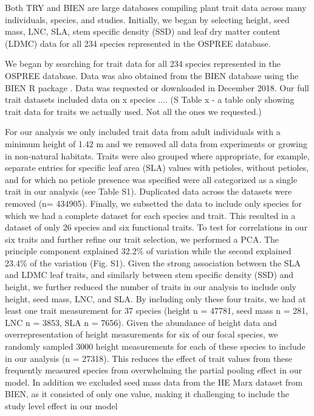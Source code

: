 \documentclass{article}\usepackage[]{graphicx}\usepackage[]{color}
\begin{document}
Both TRY and BIEN are large databases compiling plant trait data across many individuals, species, and studies. Initially, we began by selecting height, seed mass, LNC, SLA, stem specific density (SSD) and leaf dry matter content (LDMC) data for all 234 species represented in the OSPREE database.  


We began by searching for trait data for all 234 species represented in the OSPREE database. Data was also obtained from the BIEN database using the BIEN R package \citep{Maitner2017}. Data was requested or downloaded in December 2018. Our full trait datasets included data on x species .... (S Table x - a table only showing trait data for traits we actually used. Not all the ones we requested.) 

For our analysis we only included trait data from adult individuals with a minimum height of 1.42 m and we removed all data from experiments or growing in non-natural habitats. Traits were also grouped where appropriate, for example, separate entries for specific leaf area (SLA) values with petioles, without petioles, and for which no petiole presence was specified were all categorized as a single trait in our analysis (see Table S1). Duplicated data across the datasets were removed (n= 434905). Finally, we subsetted the data to include only species for which we had a complete dataset for each species and trait. This resulted in a dataset of only 26 species and six functional traits. To test for correlations in our six traits and further refine our trait selection, we performed a PCA. The principle component explained 32.2\% of variation while the second explained 23.4\% of the variation (Fig. S1). Given the strong association between the SLA and LDMC leaf traits, and similarly between stem specific density (SSD) and height, we further reduced the number of traits in our analysis to include only height, seed mass, LNC, and SLA. By including only these four traits, we had at least one trait measurement for 37 species (height n = 47781, seed mass n = 281, LNC n = 3853, SLA n = 7656). Given the abundance of height data and overrepresentation of height measurements for six of our focal species, we randomly sampled 3000 height measurements for each of these species to include in our analysis (n = 27318). This reduces the effect of trait values from these frequently measured species from overwhelming the partial pooling effect in our model. In addition we excluded seed mass data from the HE Marx dataset from BIEN, as it consisted of only one value, making it challenging to include the study level effect in our model\\ 
\end{document}
